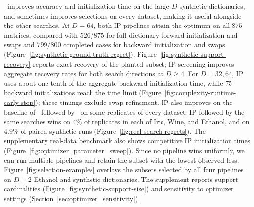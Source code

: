 \isometrypursuit~improves accuracy and initialization time on the large-$D$ synthetic dictionaries, and sometimes improves selections on every dataset, making it useful alongside the other searches.
At $D=64$, both IP pipelines attain the optimum on all $875$ matrices, compared with $526/875$ for full-dictionary forward initialization and swaps and $799/800$ completed cases for backward initialization and swaps (Figure~\ref{fig:synthetic-ground-truth-regret}).
Figure~\ref{fig:synthetic-support-recovery} reports exact recovery of the planted subset; IP screening improves aggregate recovery rates for both search directions at $D\geq4$.
For $D=32,64$, IP uses about one-tenth of the aggregate backward-initialization time, while $75$ backward initializations reach the time limit (Figure~\ref{fig:complexity-runtime-early-stop}); these timings exclude swap refinement.
IP also improves on the baseline of \backwardgreedy~followed by \forwardbackward~on some replicates of every dataset: IP followed by the same searches wins on $4\%$ of replicates in each of Iris, Wine, and Ethanol, and on $4.9\%$ of paired synthetic runs (Figure~\ref{fig:real-search-regrets}).
The supplementary real-data benchmark also shows competitive IP initialization times (Figure~\ref{fig:optimizer_parameter_sweep}).
Since no pipeline wins uniformly, we can run multiple pipelines and retain the subset with the lowest observed loss.
Figure~\ref{fig:selection-examples} overlays the subsets selected by all four pipelines on $D=2$ Ethanol and synthetic dictionaries.
The supplement reports support cardinalities (Figure~\ref{fig:synthetic-support-size}) and sensitivity to optimizer settings (Section~\ref{sec:optimizer_sensitivity}).

